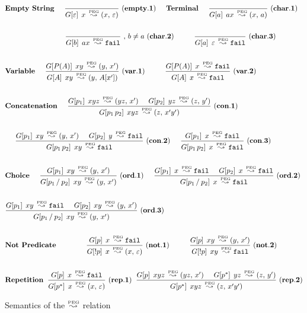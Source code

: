 \begin{figure}[p]
{\small
\begin{align*}
& \textbf{Empty String} \fivespaces
{\frac{}{\Matg{\Epsi}{x} \Lp \Tup{x}{\Epsi}}}
\mylabel{empty.1}  \fivespaces
\textbf{Terminal} \fivespaces
{\frac{}{\Matg{a}{ax} \Lp \Tup{x}{a}}} \mylabel{char.1} \\ \\
&  \tenspaces \tenspaces \tenspaces
{\frac{}{\Matg{b}{ax} \Lp \Nothing}} \mbox{ , } b \neq a \mylabel{char.2} 
\tenspaces
{\frac{}{\Matg{a}{\Epsi} \Lp \Nothing}} \mylabel{char.3}  \\ \\
& \textbf{Variable} \fivespaces
{\frac{\Matg{P(A)}{xy} \Lp \Tup{y}{\Xp}}
	{\Matg{A}{xy} \Lp \Tup{y}{A[\Xp]}}}    \mylabel{var.1}  
\tenspaces
{\frac{\Matg{P(A)}{x} \Lp \Nothing}
	{\Matg{A}{x} \Lp \Nothing}}    \mylabel{var.2}
\\ \\
& \textbf{Concatenation}
\fivespaces
{\frac{\Matg{p_1}{xyz} \Lp \Tup{yz}{\Xp} \interf \Matg{p_2}{yz}
    \Lp \Tup{z}{\Yp}}
	{\Matg{\Con{p_1}{p_2}}{xyz} \Lp \Tup{z}{\Xp \Yp}}}
      \mylabel{con.1} \\ \\
&
\fivespaces
{\frac{\Matg{p_1}{xy} \Lp \Tup{y}{\Xp} \interf \Matg{p_2}{y}
    \Lp \Nothing}
	{\Matg{\Con{p_1}{p_2}}{xy} \Lp \Nothing}}
      \mylabel{con.2}
 \fivespaces
{\frac{\Matg{p_1}{x} \Lp \Nothing}
	{\Matg{\Con{p_1}{p_2}}{x} \Lp \Nothing}} \mylabel{con.3} \\ \\
& \textbf{Choice} 
\fivespaces
{\frac{\Matg{p_1}{xy} \Lp \Tup{y}{\Xp}}
	{\Matg{\Choice{p_1}{p_2}}{xy} \Lp \Tup{y}{\Xp}}} \mylabel{ord.1} \fivespaces
{\frac{\Matg{p_1}{x} \Lp \Nothing \interf \Matg{p_2}{x} \Lp \Nothing}
	{\Matg{\Choice{p_1}{p_2}}{x} \Lp \Nothing}} \mylabel{ord.2} \\ \\ 
& {\frac{\Matg{p_1}{xy} \Lp \Nothing \interf \Matg{p_2}{xy} \Lp \Tup{y}{\Xp}}
	{\Matg{\Choice{p_1}{p_2}}{xy} \Lp \Tup{y}{\Xp}}} \mylabel{ord.3} \\ \\ 
& \textbf{Not Predicate} \tenspaces \fivespaces
{\frac{\Matg{p}{x} \Lp \Nothing} 
	{\Matg{!p}{x} \Lp \Tup{x}{\Epsi}}} \mylabel{not.1} \tenspaces
{\frac{\Matg{p}{xy} \Lp \Tup{y}{\Xp}}
	{\Matg{!p}{xy} \Lp \Nothing}} \mylabel{not.2} \\ \\
& \textbf{Repetition} \;\;
{\frac{\Matg{p}{x} \Lp \Nothing}
	{\Matg{p^*}{x} \Lp \Tup{x}{\Epsi}}} \mylabel{rep.1} \;\;
{\frac{\Matg{p}{xyz} \Lp \Tup{yz}{\Xp} \interf \Matg{p^*}{yz} \Lp \Tup{z}{\Yp}}
	{\Matg{p^*}{xyz} \Lp \Tup{z}{\Xp \Yp}}} \mylabel{rep.2} 
\end{align*}
\caption{Semantics of the $\Lp$ relation}
\label{fig:matchpeg}
}
\end{figure}

